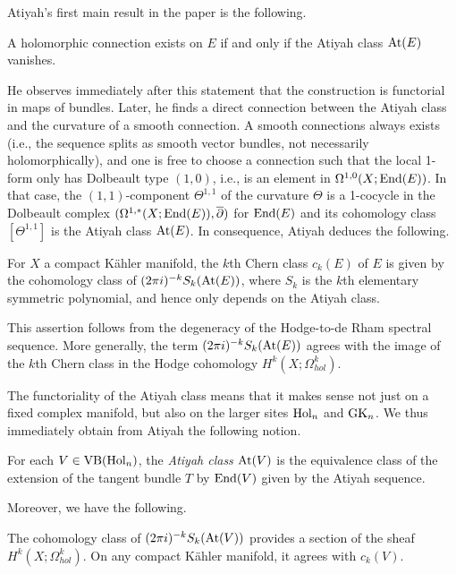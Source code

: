Atiyah's first main result in the paper is the following.

\begin{prop}
A holomorphic connection exists on $E$ if and only if the Atiyah class ${\rm At}(E)$ vanishes.
\end{prop}

He observes immediately after this statement that the construction is
functorial in maps of bundles. Later, he finds a direct connection
between the Atiyah class and the curvature of a smooth connection. A
smooth connections always exists (i.e., the sequence splits as smooth
vector bundles, not necessarily holomorphically), and one is free to
choose a connection such that the local 1-form only has
Dolbeault type $(1,0)$, i.e., is an element in $\Omega^{1,0}(X; {\rm End}(E))$. In that case, the $(1,1)$-component
$\Theta^{1,1}$ of the curvature $\Theta$ is a 1-cocycle in the
Dolbeault complex $(\Omega^{1,*}(X ; {\rm End}(E)), \overline{\partial})$ for ${\rm End}(E)$ and its cohomology class $[\Theta^{1,1}]$ is the Atiyah class ${\rm At}(E)$. In consequence, Atiyah deduces the following.

\begin{prop}
For $X$ a compact K\"ahler manifold, the $k$th Chern class $c_k(E)$ of $E$ is given by the cohomology class of $(2\pi i)^{-k} S_k({\rm At}(E))$, 
where $S_k$ is the $k$th elementary symmetric polynomial, and hence only depends on the Atiyah class.
\end{prop}

This assertion follows from the degeneracy of the Hodge-to-de Rham
spectral sequence. More generally, the term $(2\pi i)^{-k}
S_k({\rm At}(E))$ agrees with the image of the $k$th Chern class in the
Hodge cohomology $H^k(X ; \Omega^k_{hol})$.

The functoriality of the Atiyah class means that it makes sense not just on a fixed complex manifold, but also on the larger sites ${\rm Hol}_n$ and ${\rm GK}_n$. 
We thus immediately obtain from Atiyah the following notion.

\begin{dfn}
For each $V \in {\rm VB}({\rm Hol}_n)$, the {\em Atiyah class} ${\rm At}(V)$ is the equivalence class of the extension of the tangent bundle $T$ by ${\rm End}(V)$ given by the Atiyah sequence.
\end{dfn}

Moreover, we have the following.

\begin{lemma}
The cohomology class of $(2\pi i)^{-k} S_k({\rm At}(V))$ provides a section
of the sheaf $H^k(X ; \Omega^k_{hol})$. On any compact K\"ahler manifold, it agrees with $c_k(V)$.
\end{lemma}

